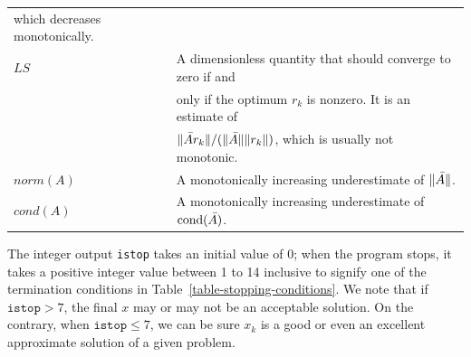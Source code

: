 \documentclass{doc_acmtrans2m}
\begin{document}
\begin{center}
\begin{longtable}{l l}
                            which decreases monotonically.
\\[2ex] $\mathit{LS}$    &  A dimensionless quantity that should
                            converge to zero if and
\\                       &  only if the optimum $r_k$ is nonzero. It
                            is an estimate of
\\                       &  $\norm{\Abar r_k}/(\norm{\Abar}\norm{r_k})$,
                            which is usually not monotonic.
\\[2ex] $\mathit{norm(A)}$
                         &  A monotonically increasing underestimate
                            of $\norm{\Abar}$.
\\[2ex] $\mathit{cond(A)}$
                         &  A monotonically increasing underestimate
                            of $\cond(\Abar)$.
\\[2ex]\hline
\end{longtable}
\end{center}

\vspace{-.1in}
The integer output \texttt{istop} takes an initial value of 0; when
the program stops, it takes a positive integer value between 1 to 14
inclusive to signify one of the termination conditions in
Table~\ref{table-stopping-conditions}.
We note that if $\texttt{istop} > 7$, the final $x$ may or may not be
an acceptable solution. On the contrary, when $\texttt{istop} \le 7$,
we can be sure $x_k$ is a good or even an excellent approximate
solution of a given problem.
\end{document}
